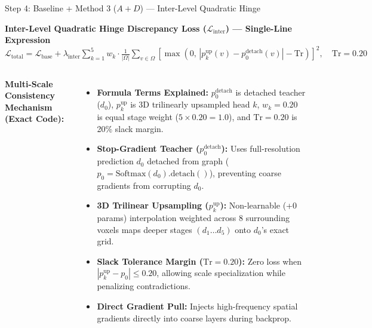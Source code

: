 \documentclass[aspectratio=169, 10pt]{beamer}
\begin{document}
\begin{frame}{Step 4: Baseline + Method 3 ($A + D$) --- Inter-Level Quadratic Hinge}
  \begin{block}{\small \textbf{Inter-Level Quadratic Hinge Discrepancy Loss ($\mathcal{L}_{\text{inter}}$) --- Single-Line Expression}}
    \centering
    $\mathcal{L}_{\text{total}} = \mathcal{L}_{\text{base}} + \lambda_{\text{inter}} \sum_{k=1}^5 w_k \cdot \frac{1}{|\Omega|} \sum_{v \in \Omega} \left[ \max\left(0, \, |p_k^{\text{up}}(v) - p_0^{\text{detach}}(v)| - \text{Tr}\right) \right]^2, \quad \text{Tr} = 0.20$
    
    \vspace{2pt}
  \end{block}
  
  \vspace{0.15cm}
  \begin{columns}[T]
    \textbf{Multi-Scale Consistency Mechanism (Exact Code):}
    \begin{itemize}\itemsep=3pt
      \scriptsize
      \item \textbf{Formula Terms Explained:} $p_0^{\text{detach}}$ is detached teacher ($d_0$), $p_k^{\text{up}}$ is 3D trilinearly upsampled head $k$, $w_k=0.20$ is equal stage weight ($5\times 0.20=1.0$), and $\text{Tr}=0.20$ is 20\% slack margin.
      \item \textbf{Stop-Gradient Teacher ($p_0^{\text{detach}}$):} Uses full-resolution prediction $d_0$ detached from graph ($p_0 = \text{Softmax}(d_0).\text{detach}()$), preventing coarse gradients from corrupting $d_0$.
      \item \textbf{3D Trilinear Upsampling ($p_k^{\text{up}}$):} Non-learnable (+0 params) interpolation weighted across 8 surrounding voxels maps deeper stages $(d_1 \dots d_5)$ onto $d_0$'s exact grid.
      \item \textbf{Slack Tolerance Margin ($\text{Tr} = 0.20$):} Zero loss when $|p_k^{\text{up}} - p_0| \le 0.20$, allowing scale specialization while penalizing contradictions.
      \item \textbf{Direct Gradient Pull:} Injects high-frequency spatial gradients directly into coarse layers during backprop.
    \end{itemize}
    

\end{columns}
\end{frame}
\end{document}
